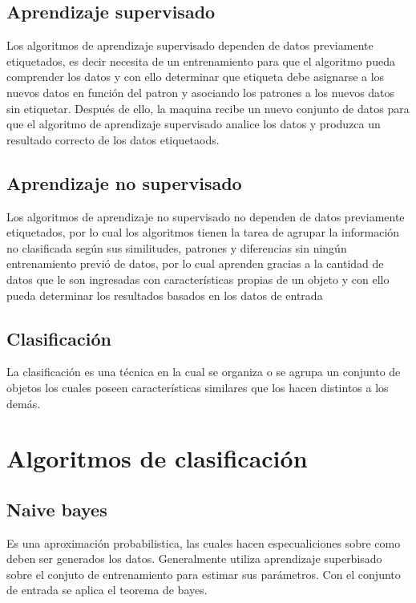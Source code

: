 \subsection{Aprendizaje supervisado}
Los algoritmos de aprendizaje supervisado dependen de datos previamente etiquetados, es decir necesita de un entrenamiento para 
que el algoritmo pueda comprender los datos y con ello determinar que etiqueta debe asignarse a los nuevos datos 
en función del patron y asociando los patrones a los nuevos datos sin etiquetar. Después de ello, la maquina recibe 
un nuevo conjunto de datos para que el algoritmo de aprendizaje supervisado analice los datos y produzca un resultado 
correcto de los datos etiquetaods.

\subsection{Aprendizaje no supervisado}
Los algoritmos de aprendizaje no supervisado no dependen de datos previamente etiquetados, por lo cual los algoritmos 
tienen la tarea de agrupar la información no clasificada según sus similitudes, patrones y diferencias sin ningún entrenamiento 
previó de datos, por lo cual aprenden gracias a la cantidad de datos que le son ingresadas con características propias de un 
objeto y con ello pueda determinar los resultados basados en los datos de entrada

\subsection{Clasificación}
La clasificación es una técnica en la cual se organiza o se agrupa un conjunto de objetos los cuales poseen características 
similares que los hacen distintos a los demás.

\section{Algoritmos de clasificación}

\subsection{Naive bayes}
Es una aproximación probabilistica, las cuales hacen especualiciones sobre como deben ser generados 
los datos. Generalmente utiliza aprendizaje superbisado sobre el conjuto de entrenamiento para estimar 
sus parámetros. Con el conjunto de entrada se aplica el teorema de bayes.

